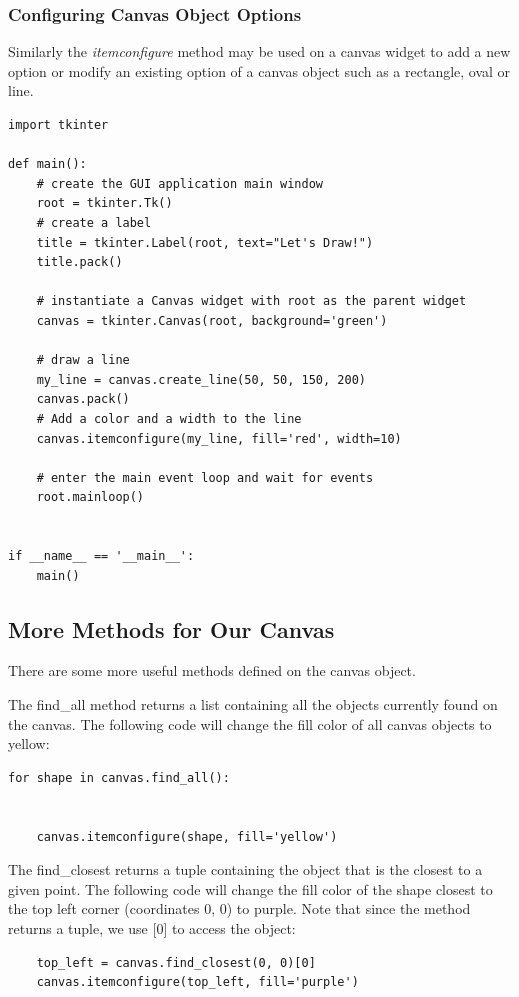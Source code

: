 \documentclass{article}
\begin{document}
\subsubsection{Configuring Canvas Object Options}
Similarly the \textit{itemconfigure} method may be used on a canvas widget to add a new option or modify an existing option of a canvas object such as a rectangle, oval or line.

\begin{lstlisting}
import tkinter

def main():
    # create the GUI application main window
    root = tkinter.Tk()
    # create a label
    title = tkinter.Label(root, text="Let's Draw!")
    title.pack()

    # instantiate a Canvas widget with root as the parent widget
    canvas = tkinter.Canvas(root, background='green')

    # draw a line
    my_line = canvas.create_line(50, 50, 150, 200)
    canvas.pack()
    # Add a color and a width to the line
    canvas.itemconfigure(my_line, fill='red', width=10)

    # enter the main event loop and wait for events
    root.mainloop()


if __name__ == '__main__':
    main()
\end{lstlisting}

\subsection{More Methods for Our Canvas}
There are some more useful methods defined on the canvas object.

The find{\_}all method returns a list containing all the objects currently found on the canvas.  The following code will change the fill color of all canvas objects to yellow: 

\begin{lstlisting}
for shape in canvas.find_all():


    canvas.itemconfigure(shape, fill='yellow')
\end{lstlisting}

The find{\_}closest returns a tuple containing the object that is the closest to a given point.  The following code will change the fill color of the shape closest to the top left corner (coordinates 0, 0) to purple.  Note that since the method returns a tuple, we use [0] to access the object:

\begin{lstlisting}
    top_left = canvas.find_closest(0, 0)[0]
    canvas.itemconfigure(top_left, fill='purple')
\end{lstlisting}
\end{document}
